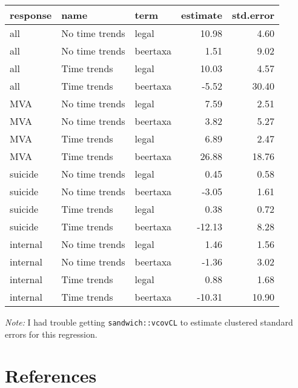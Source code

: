 \documentclass[]{book}
\newenvironment{Shaded}{\begin{snugshade}}{\end{snugshade}}
\newcommand{\DataTypeTok}[1]{\textcolor[rgb]{0.13,0.29,0.53}{#1}}
\newcommand{\DecValTok}[1]{\textcolor[rgb]{0.00,0.00,0.81}{#1}}
\newcommand{\KeywordTok}[1]{\textcolor[rgb]{0.13,0.29,0.53}{\textbf{#1}}}
\newcommand{\NormalTok}[1]{#1}
\newcommand{\OperatorTok}[1]{\textcolor[rgb]{0.81,0.36,0.00}{\textbf{#1}}}
\newcommand{\StringTok}[1]{\textcolor[rgb]{0.31,0.60,0.02}{#1}}
\theoremstyle{definition}
\theoremstyle{definition}
\theoremstyle{definition}
\theoremstyle{remark}
\begin{document}
\begin{Shaded}
\end{Shaded}

\begin{tabular}{l|l|l|r|r}
\hline
response & name & term & estimate & std.error\\
\hline
all & No time trends & legal & 10.98 & 4.60\\
\hline
all & No time trends & beertaxa & 1.51 & 9.02\\
\hline
all & Time trends & legal & 10.03 & 4.57\\
\hline
all & Time trends & beertaxa & -5.52 & 30.40\\
\hline
MVA & No time trends & legal & 7.59 & 2.51\\
\hline
MVA & No time trends & beertaxa & 3.82 & 5.27\\
\hline
MVA & Time trends & legal & 6.89 & 2.47\\
\hline
MVA & Time trends & beertaxa & 26.88 & 18.76\\
\hline
suicide & No time trends & legal & 0.45 & 0.58\\
\hline
suicide & No time trends & beertaxa & -3.05 & 1.61\\
\hline
suicide & Time trends & legal & 0.38 & 0.72\\
\hline
suicide & Time trends & beertaxa & -12.13 & 8.28\\
\hline
internal & No time trends & legal & 1.46 & 1.56\\
\hline
internal & No time trends & beertaxa & -1.36 & 3.02\\
\hline
internal & Time trends & legal & 0.88 & 1.68\\
\hline
internal & Time trends & beertaxa & -10.31 & 10.90\\
\hline
\end{tabular}

\emph{Note:} I had trouble getting \texttt{sandwich::vcovCL} to estimate
clustered standard errors for this regression.

\hypertarget{references-5}{%
\section{References}\label{references-5}}
\end{document}
